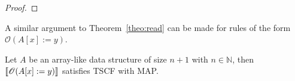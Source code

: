 \begin{proof}
%     
    
\end{proof}

A similar argument to Theorem~\ref{theo:read} can be made for rules of the form $\mathscr{O}(A[x]:=y)$.
\begin{theorem}
    \label{theo:write}
    Let $A$ be an array-like data structure of size $n+1$ with $n\in \mathbb{N}$, then $\llbracket \mathscr{O}(A[x]:=y)\rrbracket$ satisfies TSCF with MAP.
\end{theorem}
